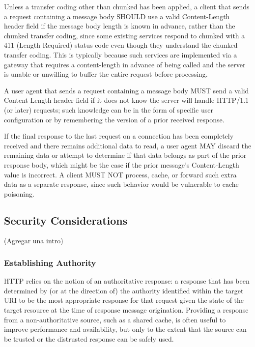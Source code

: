 Unless a transfer coding other than chunked has been applied, a
client that sends a request containing a message body SHOULD use a
valid Content-Length header field if the message body length is known
in advance, rather than the chunked transfer coding, since some
existing services respond to chunked with a 411 (Length Required)
status code even though they understand the chunked transfer coding.
This is typically because such services are implemented via a gateway
that requires a content-length in advance of being called and the
server is unable or unwilling to buffer the entire request before
processing.

A user agent that sends a request containing a message body MUST send
a valid Content-Length header field if it does not know the server
will handle HTTP/1.1 (or later) requests; such knowledge can be in
the form of specific user configuration or by remembering the version
of a prior received response.

If the final response to the last request on a connection has been
completely received and there remains additional data to read, a user
agent MAY discard the remaining data or attempt to determine if that
data belongs as part of the prior response body, which might be the
case if the prior message's Content-Length value is incorrect.  A
client MUST NOT process, cache, or forward such extra data as a
separate response, since such behavior would be vulnerable to cache
poisoning.

\subsection{Security Considerations}
(Agregar una intro)

\subsubsection{Establishing Authority}

HTTP relies on the notion of an authoritative response: a response
that has been determined by (or at the direction of) the authority
identified within the target URI to be the most appropriate response
for that request given the state of the target resource at the time
of response message origination.  Providing a response from a
non-authoritative source, such as a shared cache, is often useful to
improve performance and availability, but only to the extent that the
source can be trusted or the distrusted response can be safely used.


